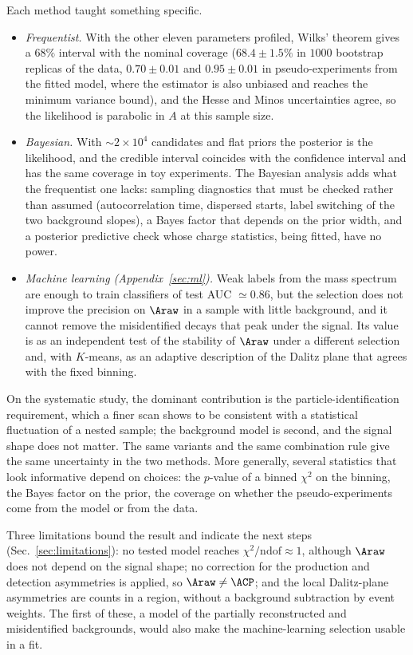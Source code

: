Each method taught something specific.
\begin{itemize}[leftmargin=*,itemsep=2pt]
\item \emph{Frequentist.} With the other eleven parameters profiled, Wilks' theorem gives a $68\%$ interval with the nominal coverage ($68.4\pm1.5\%$ in $1000$ bootstrap replicas of the data, $0.70\pm0.01$ and $0.95\pm0.01$ in pseudo-experiments from the fitted model, where the estimator is also unbiased and reaches the minimum variance bound), and the Hesse and Minos uncertainties agree, so the likelihood is parabolic in $A$ at this sample size.
\item \emph{Bayesian.} With $\sim2\times10^4$ candidates and flat priors the posterior is the likelihood, and the credible interval coincides with the confidence interval and has the same coverage in toy experiments. The Bayesian analysis adds what the frequentist one lacks: sampling diagnostics that must be checked rather than assumed (autocorrelation time, dispersed starts, label switching of the two background slopes), a Bayes factor that depends on the prior width, and a posterior predictive check whose charge statistics, being fitted, have no power.
\item \emph{Machine learning (Appendix~\ref{sec:ml}).} Weak labels from the mass spectrum are enough to train classifiers of test AUC $\simeq0.86$, but the selection does not improve the precision on $\Araw$ in a sample with little background, and it cannot remove the misidentified decays that peak under the signal. Its value is as an independent test of the stability of $\Araw$ under a different selection and, with $K$-means, as an adaptive description of the Dalitz plane that agrees with the fixed binning.
\end{itemize}

On the systematic study, the dominant contribution is the particle-identification requirement, which a finer scan shows to be consistent with a statistical fluctuation of a nested sample; the background model is second, and the signal shape does not matter. The same variants and the same combination rule give the same uncertainty in the two methods. More generally, several statistics that look informative depend on choices: the $p$-value of a binned $\chi^2$ on the binning, the Bayes factor on the prior, the coverage on whether the pseudo-experiments come from the model or from the data.

Three limitations bound the result and indicate the next steps (Sec.~\ref{sec:limitations}): no tested model reaches $\chi^2/\mathrm{ndof}\approx1$, although $\Araw$ does not depend on the signal shape; no correction for the production and detection asymmetries is applied, so $\Araw\neq\ACP$; and the local Dalitz-plane asymmetries are counts in a region, without a background subtraction by event weights. The first of these, a model of the partially reconstructed and misidentified backgrounds, would also make the machine-learning selection usable in a fit.
